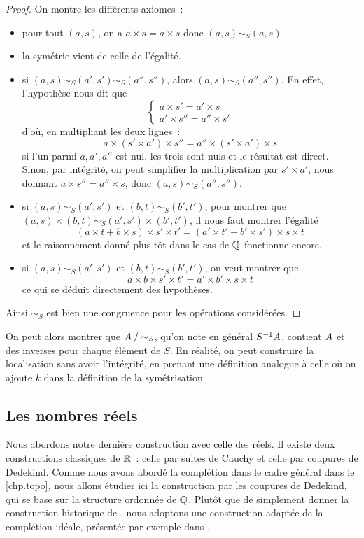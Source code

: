 \begin{proof}
  On montre les différents axiomes~:
  \begin{itemize}
  \item pour tout $(a,s)$, on a $a\times s = a \times s$ donc
    $(a,s)\sim_S(a,s)$.
  \item la symétrie vient de celle de l'égalité.
  \item si $(a,s)\sim_S(a',s')\sim_S(a'',s'')$, alors $(a,s)\sim_S(a'',s'')$. En
    effet, l'hypothèse nous dit que
    \[\begin{cases}
    a \times s' = a' \times s\\
    a' \times s'' = a'' \times s'
    \end{cases}\]
    d'où, en multipliant les deux lignes~:
    \[a\times (s'\times a') \times s'' = a''\times (s'\times a') \times s\]
    si l'un parmi $a,a',a''$ est nul, les trois sont nuls et le résultat est
    direct. Sinon, par intégrité, on peut simplifier la multiplication par
    $s'\times a'$, nous donnant $a\times s'' = a'' \times s$, donc
    $(a,s) \sim_S (a'',s'')$.
  \item si $(a,s)\sim_S(a',s')$ et $(b,t)\sim_S(b',t')$, pour montrer que
    $(a,s)\times(b,t)\sim_S (a',s')\times (b',t')$, il nous faut montrer
    l'égalité
    \[(a\times t + b \times s)\times s' \times t' =
    (a'\times t' + b' \times s')\times s \times t\]
    et le raisonnement donné plus tôt dans le cas de $\mathbb Q$ fonctionne
    encore.
  \item si $(a,s)\sim_S(a',s')$ et $(b,t)\sim_S(b',t')$, on veut montrer que
    \[a\times b \times s' \times t' = a' \times b' \times s \times t\]
    ce qui se déduit directement des hypothèses.
  \end{itemize}
  Ainsi $\sim_S$ est bien une congruence pour les opérations considérées.
\end{proof}

On peut alors montrer que $\mathord{A}\mathbin{/}\mathord{\sim_S}$, qu'on note en général
$S^{-1}A$, contient $A$ et des inverses pour chaque élément de $S$.
En réalité, on peut construire la localisation sans avoir l'intégrité, en
prenant une définition analogue à celle où on ajoute $k$ dans la définition de
la symétrisation.

\subsection{Les nombres réels}

Nous abordons notre dernière construction avec celle des réels. Il existe deux
constructions classiques de $\mathbb R$~: celle par suites de Cauchy et celle
par coupures de Dedekind. Comme nous avons abordé la complétion dans le cadre
général dans le \cref{chp.topo}, nous allons étudier ici la construction par
les coupures de Dedekind, qui se base sur la structure ordonnée de $\mathbb Q$.
Plutôt que de simplement donner la construction historique de
\cite{Dedekind1872}, nous adoptons une construction adaptée de la complétion
idéale, présentée par exemple dans \cite{AmadioCurien1998}.

